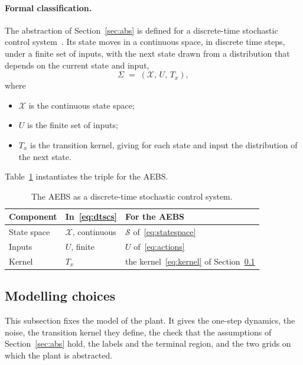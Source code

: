 \documentclass[11pt,a4paper]{article}
\theoremstyle{plain}
\theoremstyle{remark}
\begin{document}
	\paragraph{Formal classification.}
	The abstraction of Section~\ref{sec:abs} is defined for a discrete-time stochastic control system~\cite[Sec.~3]{Soudjani2013}. Its state moves in a continuous space, in discrete time steps, under a finite set of inputs, with the next state drawn from a distribution that depends on the current state and input,
	\begin{equation}
		\Sigma \;=\; (\mathcal{X},\, U,\, T_x),
		\label{eq:dtscs}
	\end{equation}
	where
	\begin{itemize}
		\item $\mathcal{X}$ is the continuous state space;
		\item $U$ is the finite set of inputs;
		\item $T_x$ is the transition kernel, giving for each state and input the distribution of the next state.
	\end{itemize}
	Table~\ref{tab:instance} instantiates the triple for the AEBS.
	
	\begin{table}[H]
		\centering
		\begin{tabular}{lll}
			\toprule
			Component & In~\eqref{eq:dtscs} & For the AEBS \\
			\midrule
			State space & $\mathcal{X}$, continuous & $\mathcal{S}$ of~\eqref{eq:statespace} \\
			Inputs & $U$, finite & $U$ of~\eqref{eq:actions} \\
			Kernel & $T_x$ & the kernel~\eqref{eq:kernel} of Section~\ref{sec:cs:model} \\
			\bottomrule
		\end{tabular}
		\caption{The AEBS as a discrete-time stochastic control system.}
		\label{tab:instance}
	\end{table}
	
	\subsection{Modelling choices}
	\label{sec:cs:model}
	
	This subsection fixes the model of the plant. It gives the one-step dynamics, the noise, the transition kernel they define, the check that the assumptions of Section~\ref{sec:abs} hold, the labels and the terminal region, and the two grids on which the plant is abstracted.
	
\end{document}
